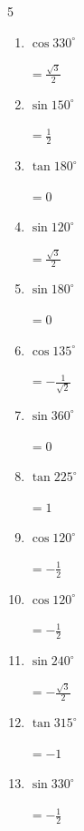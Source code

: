 \begin{multicols}{5}
\begin{enumerate}
        $\displaystyle =-1$

  \item $\displaystyle \cos{330^\circ}$

        $\displaystyle =\frac{\sqrt{3}}{2}$

  \item $\displaystyle \sin{150^\circ}$

        $\displaystyle =\frac{1}{2}$

  \item $\displaystyle \tan{180^\circ}$

        $\displaystyle =0$

  \item $\displaystyle \sin{120^\circ}$

        $\displaystyle =\frac{\sqrt{3}}{2}$

  \item $\displaystyle \sin{180^\circ}$

        $\displaystyle =0$

  \item $\displaystyle \cos{135^\circ}$

        $\displaystyle =-\frac{1}{\sqrt{2}}$

  \item $\displaystyle \sin{360^\circ}$

        $\displaystyle =0$

  \item $\displaystyle \tan{225^\circ}$

        $\displaystyle =1$

  \item $\displaystyle \cos{120^\circ}$

        $\displaystyle =-\frac{1}{2}$

  \item $\displaystyle \cos{120^\circ}$

        $\displaystyle =-\frac{1}{2}$

  \item $\displaystyle \sin{240^\circ}$

        $\displaystyle =-\frac{\sqrt{3}}{2}$

  \item $\displaystyle \tan{315^\circ}$

        $\displaystyle =-1$

  \item $\displaystyle \sin{330^\circ}$

        $\displaystyle =-\frac{1}{2}$


\end{enumerate}
\end{multicols}

